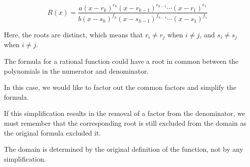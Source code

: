 \documentclass{ximera}
\begin{document}
\[  R(x)  = \frac{a (x - r_k)^{e_k} (x - r_{k-1})^{e_{k-1}} \cdots (x - r_1)^{e_1} }{b (x - s_h)^{f_h} (x - s_{h-1})^{f_{h-1}} \cdots (x - s_1)^{f_1}}            \]


Here, the roots are distinct, which means that  $r_i \ne r_j$ when $i \ne j$, and $s_i \ne s_j$ when $i \ne j$.



\begin{warning}  

The formula for a rational function could have a root in common between the polynomials in the numerator and denominator.

In this case, we would like to factor out the common factors and simplify the formula.

If this simplification results in the removal of a factor from the denominator, we must remember that the corresponding root is still excluded from the domain as the original formula excluded it.

The domain is determined by the original definition of the function, not by any simplification.

\end{warning}
\end{document}
